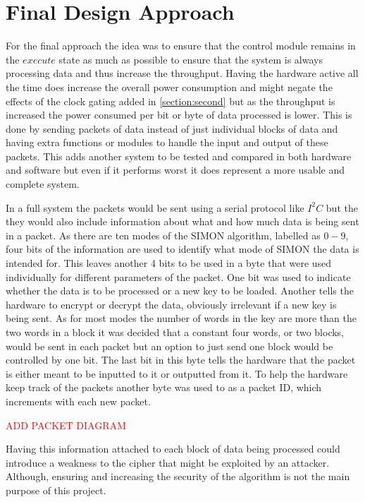 \documentclass[12pt,twoside,a4paper]{report}
\begin{document}
	\chapter{Final Design Approach}
	\label{chapter:FINAL}
	For the final approach the idea was to ensure that the control module remains in the $execute$ state as much as possible to ensure that the system is always processing data and thus increase the throughput. Having the hardware active all the time does increase the overall power consumption and might negate the effects of the clock gating added in \autoref{section:second} but as the throughput is increased the power consumed per bit or byte of data processed is lower. This is done by sending packets of data instead of just individual blocks of data and having extra functions or modules to handle the input and output of these packets. This adds another system to be tested and compared in both hardware and software but even if it performs worst it does represent a more usable and complete system.
    
	In a full system the packets would be sent using a serial protocol like $I^2C$ but the they would also include information about what and how much data is being sent in a packet. As there are ten modes of the SIMON algorithm, labelled as $0 - 9$, four bits of the information are used to identify what mode of SIMON the data is intended for. This leaves another 4 bits to be used in a byte that were used individually for different parameters of the packet. One bit was used to indicate whether the data is to be processed or a new key to be loaded. Another tells the hardware to encrypt or decrypt the data, obviously irrelevant if a new key is being sent. As for most modes the number of words in the key are more than the two words in a block it was decided that a constant four words, or two blocks, would be sent in each packet but an option to just send one block would be controlled by one bit. The last bit in this byte tells the hardware that the packet is either meant to be inputted to it or outputted from it. To help the hardware keep track of the packets another byte was used to as a packet ID, which increments with each new packet.
    
	\textcolor{red}{ADD PACKET DIAGRAM}
	
	Having this information attached to each block of data being processed could introduce a weakness to the cipher that might be exploited by an attacker. Although, ensuring and increasing the security of the algorithm is not the main purpose of this project.
    
\end{document}

